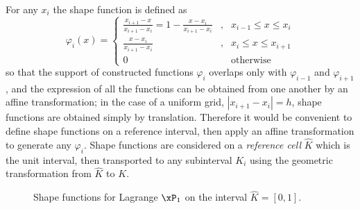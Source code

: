 \medskip
For any $x_i$ the shape function is defined as
\begin{equation*}
\varphi_{i}(x) =
\left\lbrace
\begin{array}{lcl}
\displaystyle\frac{x_{i+1} - x}{x_{i+1} - x_{i}} = 1 - \frac{x - x_{i}}{x_{i+1} - x_{i}}&,& x_{i-1} \leq x \leq x_{i}\\[2ex]
\displaystyle\frac{x - x_{i}}{x_{i+1} - x_{i}}&,& x_{i} \leq x \leq x_{i+1}\\[2ex]
0 &&\mbox{otherwise}
\end{array}
\right.
\end{equation*}
so that the support of constructed functions $\varphi_i$ overlaps only with $\varphi_{i-1}$ and $\varphi_{i+1}$, and the expression of all the functions can be obtained from one another by an affine transformation; in the case of a uniform grid, $|x_{i+1} - x_{i}| = h$, shape functions are obtained simply by translation.
Therefore it would be convenient to define shape functions on a reference interval, then apply an affine transformation to generate any $\varphi_i$.
Shape functions are considered on a \textit{reference cell} $\hat{K}$ which is the unit interval, then transported to any subinterval $K_i$ using the geometric transformation from $\hat{K}$ to $K$.

\begin{figure}[h!]\label{fig:lagrange_shape_functions}
\centering
{}
\caption{Shape functions for Lagrange $\xPone$ on the interval $\hat{K} = [0,1]$.}
\end{figure}

